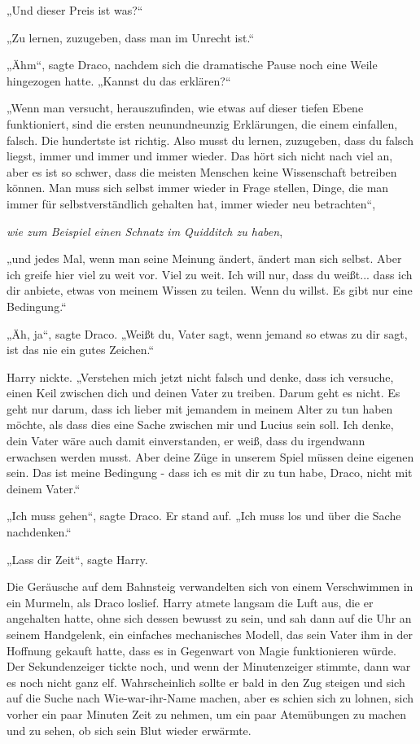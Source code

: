 {„Und dieser Preis ist was?“

„Zu lernen, zuzugeben, dass man im Unrecht ist.“

„Ähm“, sagte Draco, nachdem sich die dramatische Pause noch eine Weile hingezogen hatte. „Kannst du das erklären?“

„Wenn man versucht, herauszufinden, wie etwas auf dieser tiefen Ebene funktioniert, sind die ersten neunundneunzig Erklärungen, die einem einfallen, falsch. Die hundertste ist richtig. Also musst du lernen, zuzugeben, dass du falsch liegst, immer und immer und immer wieder. Das hört sich nicht nach viel an, aber es ist so schwer, dass die meisten Menschen keine Wissenschaft betreiben können. Man muss sich selbst immer wieder in Frage stellen, Dinge, die man immer für selbstverständlich gehalten hat, immer wieder neu betrachten“,

\emph{wie zum Beispiel einen Schnatz im Quidditch zu haben},

„und jedes Mal, wenn man seine Meinung ändert, ändert man sich selbst. Aber ich greife hier viel zu weit vor. Viel zu weit. Ich will nur, dass du weißt... dass ich dir anbiete, etwas von meinem Wissen zu teilen. Wenn du willst. Es gibt nur eine Bedingung.“

„Äh, ja“, sagte Draco. „Weißt du, Vater sagt, wenn jemand so etwas zu dir sagt, ist das nie ein gutes Zeichen.“

Harry nickte. „Verstehen mich jetzt nicht falsch und denke, dass ich versuche, einen Keil zwischen dich und deinen Vater zu treiben. Darum geht es nicht. Es geht nur darum, dass ich lieber mit jemandem in meinem Alter zu tun haben möchte, als dass dies eine Sache zwischen mir und Lucius sein soll. Ich denke, dein Vater wäre auch damit einverstanden, er weiß, dass du irgendwann erwachsen werden musst. Aber deine Züge in unserem Spiel müssen deine eigenen sein. Das ist meine Bedingung - dass ich es mit dir zu tun habe, Draco, nicht mit deinem Vater.“

„Ich muss gehen“, sagte Draco. Er stand auf. „Ich muss los und über die Sache nachdenken.“

„Lass dir Zeit“, sagte Harry.

Die Geräusche auf dem Bahnsteig verwandelten sich von einem Verschwimmen in ein Murmeln, als Draco loslief. Harry atmete langsam die Luft aus, die er angehalten hatte, ohne sich dessen bewusst zu sein, und sah dann auf die Uhr an seinem Handgelenk, ein einfaches mechanisches Modell, das sein Vater ihm in der Hoffnung gekauft hatte, dass es in Gegenwart von Magie funktionieren würde. Der Sekundenzeiger tickte noch, und wenn der Minutenzeiger stimmte, dann war es noch nicht ganz elf. Wahrscheinlich sollte er bald in den Zug steigen und sich auf die Suche nach Wie-war-ihr-Name machen, aber es schien sich zu lohnen, sich vorher ein paar Minuten Zeit zu nehmen, um ein paar Atemübungen zu machen und zu sehen, ob sich sein Blut wieder erwärmte.

}
